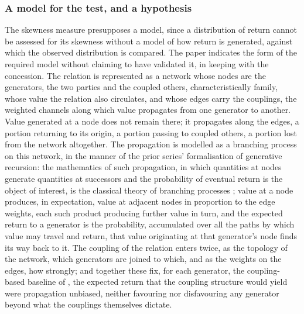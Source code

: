 \subsubsection{A model for the test, and a hypothesis}
\label{p11:sec:ev-model}

The skewness measure presupposes a model, since a distribution of return cannot be assessed for its skewness without a model of how return is generated, against which the observed distribution is compared. The paper indicates the form of the required model without claiming to have validated it, in keeping with the concession. The relation is represented as a network whose nodes are the generators, the two parties and the coupled others, characteristically family, whose value the relation also circulates, and whose edges carry the couplings, the weighted channels along which value propagates from one generator to another. Value generated at a node does not remain there; it propagates along the edges, a portion returning to its origin, a portion passing to coupled others, a portion lost from the network altogether. The propagation is modelled as a branching process on this network, in the manner of the prior series' formalisation of generative recursion: the mathematics of such propagation, in which quantities at nodes generate quantities at successors and the probability of eventual return is the object of interest, is the classical theory of branching processes \parencite{harris1963}; value at a node produces, in expectation, value at adjacent nodes in proportion to the edge weights, each such product producing further value in turn, and the expected return to a generator is the probability, accumulated over all the paths by which value may travel and return, that value originating at that generator's node finds its way back to it. The coupling of the relation enters twice, as the topology of the network, which generators are joined to which, and as the weights on the edges, how strongly; and together these fix, for each generator, the coupling-based baseline of , the expected return that the coupling structure would yield were propagation unbiased, neither favouring nor disfavouring any generator beyond what the couplings themselves dictate.

